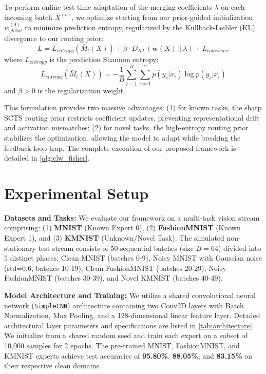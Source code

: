 \documentclass{article}
\theoremstyle{plain}
\theoremstyle{definition}
\theoremstyle{remark}
\begin{document}
To perform online test-time adaptation of the merging coefficients $\lambda$ on each incoming batch $X^{(t)}$, we optimize starting from our prior-guided initialization $w_{global}^{(0)}$ to minimize prediction entropy, regularized by the Kullback-Leibler (KL) divergence to our routing prior:
\begin{equation}
  L = L_{entropy}(\bar{M}_t(X)) + \beta \cdot D_{KL}\left( \mathbf{w}(X) \,||\, \lambda \right) + L_{coherence}
\end{equation}
where $L_{entropy}$ is the prediction Shannon entropy:
\begin{equation}
  L_{entropy}(\bar{M}_t(X)) = -\frac{1}{B} \sum_{i=1}^B \sum_{c=1}^C p(y_c|x_i) \log p(y_c|x_i)
\end{equation}
and $\beta > 0$ is the regularization weight. 

This formulation provides two massive advantages: (1) for known tasks, the sharp SCTS routing prior restricts coefficient updates, preventing representational drift and activation mismatches; (2) for novel tasks, the high-entropy routing prior stabilizes the optimization, allowing the model to adapt while breaking the feedback loop trap. The complete execution of our proposed framework is detailed in \cref{alg:clw_fisher}.

\section{Experimental Setup}
\label{sec:setup}

\textbf{Datasets and Tasks:} We evaluate our framework on a multi-task vision stream comprising: (1) \textbf{MNIST} \cite{lecun1998gradient} (Known Expert 0), (2) \textbf{FashionMNIST} \cite{xiao2017fashion} (Known Expert 1), and (3) \textbf{KMNIST} \cite{clanuwat2018deep} (Unknown/Novel Task). The simulated non-stationary test stream consists of 50 sequential batches (size $B=64$) divided into 5 distinct phases: Clean MNIST (batches 0-9), Noisy MNIST with Gaussian noise (std=0.6, batches 10-19), Clean FashionMNIST (batches 20-29), Noisy FashionMNIST (batches 30-39), and Novel KMNIST (batches 40-49).

\textbf{Model Architecture and Training:} We utilize a shared convolutional neural network (\texttt{SimpleCNN}) architecture containing two Conv2D layers with Batch Normalization, Max Pooling, and a 128-dimensional linear feature layer. Detailed architectural layer parameters and specifications are listed in \cref{tab:architecture}. We initialize from a shared random seed and train each expert on a subset of 10,000 samples for 2 epochs. The pre-trained MNIST, FashionMNIST, and KMNIST experts achieve test accuracies of \textbf{95.80\%}, \textbf{88.05\%}, and \textbf{83.15\%} on their respective clean domains.
\end{document}
